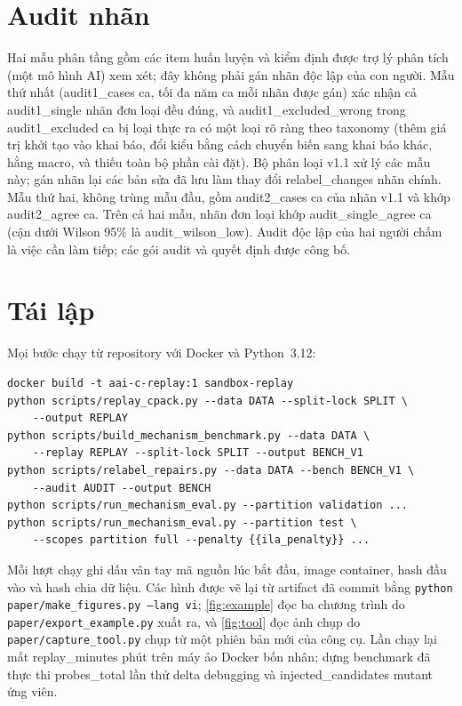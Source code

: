 \section{Audit nhãn}\label{app:audit}
Hai mẫu phân tầng gồm các item huấn luyện và kiểm định được trợ lý phân tích (một mô hình AI) xem xét; đây không phải gán nhãn độc lập của con người. Mẫu thứ nhất ({{audit1_cases}} ca, tối đa năm ca mỗi nhãn được gán) xác nhận cả {{audit1_single}} nhãn đơn loại đều đúng, và {{audit1_excluded_wrong}} trong {{audit1_excluded}} ca bị loại thực ra có một loại rõ ràng theo taxonomy (thêm giá trị khởi tạo vào khai báo, đổi kiểu bằng cách chuyển biến sang khai báo khác, hằng macro, và thiếu toàn bộ phần cài đặt). Bộ phân loại v1.1 xử lý các mẫu này; gán nhãn lại các bản sửa đã lưu làm thay đổi {{relabel_changes}} nhãn chính. Mẫu thứ hai, không trùng mẫu đầu, gồm {{audit2_cases}} ca của nhãn v1.1 và khớp {{audit2_agree}} ca. Trên cả hai mẫu, nhãn đơn loại khớp {{audit_single_agree}} ca (cận dưới Wilson 95\% là {{audit_wilson_low}}). Audit độc lập của hai người chấm là việc cần làm tiếp; các gói audit và quyết định được công bố.

\section{Tái lập}\label{app:repro}
Mọi bước chạy từ repository với Docker và Python~3.12:
\begin{verbatim}
docker build -t aai-c-replay:1 sandbox-replay
python scripts/replay_cpack.py --data DATA --split-lock SPLIT \
    --output REPLAY
python scripts/build_mechanism_benchmark.py --data DATA \
    --replay REPLAY --split-lock SPLIT --output BENCH_V1
python scripts/relabel_repairs.py --data DATA --bench BENCH_V1 \
    --audit AUDIT --output BENCH
python scripts/run_mechanism_eval.py --partition validation ...
python scripts/run_mechanism_eval.py --partition test \
    --scopes partition full --penalty {{ila_penalty}} ...
\end{verbatim}
Mỗi lượt chạy ghi dấu vân tay mã nguồn lúc bắt đầu, image container, hash đầu vào và hash chia dữ liệu. Các hình được vẽ lại từ artifact đã commit bằng \texttt{python paper/make\_figures.py --lang vi}; \cref{fig:example} đọc ba chương trình do \texttt{paper/export\_example.py} xuất ra, và \cref{fig:tool} đọc ảnh chụp do \texttt{paper/capture\_tool.py} chụp từ một phiên bản mới của công cụ. Lần chạy lại mất {{replay_minutes}} phút trên máy ảo Docker bốn nhân; dựng benchmark đã thực thi {{probes_total}} lần thử delta debugging và {{injected_candidates}} mutant ứng viên.

